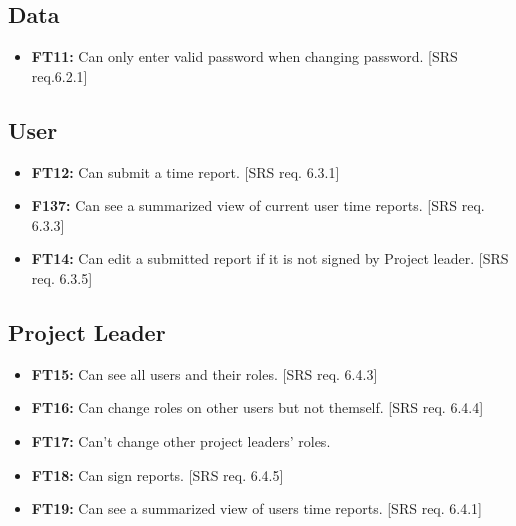 \documentclass{article}
\begin{document}
		\subsection{Data}
		
		\begin{itemize}
  			\item \textbf{FT11:} Can only enter valid password when changing password. [SRS req.6.2.1]

		\end{itemize}
		
		\subsection{User}
		
		\begin{itemize}
  			\item \textbf{FT12:} Can submit a time report. [SRS req. 6.3.1]
  			
  			\item \textbf{F137:} Can see a summarized view of current user time reports. [SRS req. 6.3.3]
  			
  			\item \textbf{FT14:} Can edit a submitted report if it is not signed by Project leader. [SRS req. 6.3.5]

		\end{itemize}
		
		\subsection{Project Leader}
		
			\begin{itemize}
  			\item \textbf{FT15:} Can see all users and their roles. [SRS req. 6.4.3]

  			\item \textbf{FT16:} Can change roles on other users but not themself. [SRS req. 6.4.4]
  			
  			\item \textbf{FT17:} Can’t change other project leaders' roles.
  			
  			\item \textbf{FT18:} Can sign reports. [SRS req. 6.4.5]

  			\item \textbf{FT19:} Can see a summarized view of users time reports. [SRS req. 6.4.1]

		\end{itemize}
		
\end{document}
